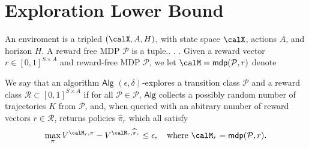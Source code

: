 
\section{Exploration Lower Bound}
\newcommand{\tv}{\mathrm{TV}}
\newcommand{\KL}{\mathrm{KL}}
\newcommand{\Binf}{\mathcal{B}_{\infty}}
\newcommand{\unifsim}{\overset{\mathrm{unif}}{\sim}}
\newcommand{\Algest}{\Alg_{\mathrm{est}}}
\newcommand{\Jhat}{\widehat{J}}
\newcommand{\jhat}{\widehat{j}}
\newcommand{\calY}{\mathcal{Y}}
\newcommand{\vecone}{\mathbf{1}}
\newcommand{\calK}{\mathcal{K}}
\newcommand{\BigOh}[1]{\mathcal{O}\left(#1\right)}
\newcommand{\pist}{\pi^{\star}}
\newcommand{\I}{\mathbf{1}}
\newcommand{\calD}{\mathcal{D}}
\renewcommand{\lnot}{\ell_0}
\newcommand{\lmax}{\ell_{\max}}

\newcommand{\calT}{\mathcal{T}}
\newcommand{\Mclass}{\mathscr{M}}
\newcommand{\Pclass}{\mathscr{P}}
\newcommand{\Phard}{\Pclass_{\mathrm{hard}}}
\newcommand{\Rhard}{\Rclass_{\mathrm{hard}}}
\newcommand{\Ehard}{\Envir_{\mathrm{hard}}}

\newcommand{\Pembed}{\Pclass_{\mathrm{embd}}}
\newcommand{\Rembed}{\Rclass_{\mathrm{embed}}}
\newcommand{\Eembed}{\Envir_{\mathrm{embed}}}

\newcommand{\Rclass}{\mathscr{R}}

\newcommand{\Alg}{\mathsf{Alg}}
\newcommand{\Envir}{\mathscr{E}}
\newcommand{\calP}{\mathcal{P}}
\newcommand{\mdp}{\mathsf{mdp}}
\newcommand{\pihat}{\widehat{\pi}}

\begin{definition} An enviroment is a tripled $(\calX,A,H)$, with state space $\calX$, actions $A$, and horizon $H$. A reward free MDP $\calP$ is a tuple.. . . Given a reward vector $r \in [0,1]^{S \times A}$ and reward-free MDP $\calP$, we let $\calM = \mdp(\calP,r)$ denote 
\end{definition}


\begin{definition} We say that an algorithm $\Alg$ $(\epsilon,\delta)$-explores a transition class $\Pclass$ and a reward class $\Rclass \subset [0,1]^{S \times A}$ if for all $\calP \in \Pclass$, $\Alg$ collects a possibly random number of trajectories $K$ from $\calP$, and, when queried with an abitrary number of reward vectors $r \in \Rclass$, returns policies $\pihat_r$ which all satisfy
\begin{align*}
\max_{\pi} V^{\calM_r, \pi} - V^{\calM_r,\pihat_r} \le \epsilon, \quad \text{where } \calM_r = \mdp(\calP,r).
\end{align*}
\end{definition}

